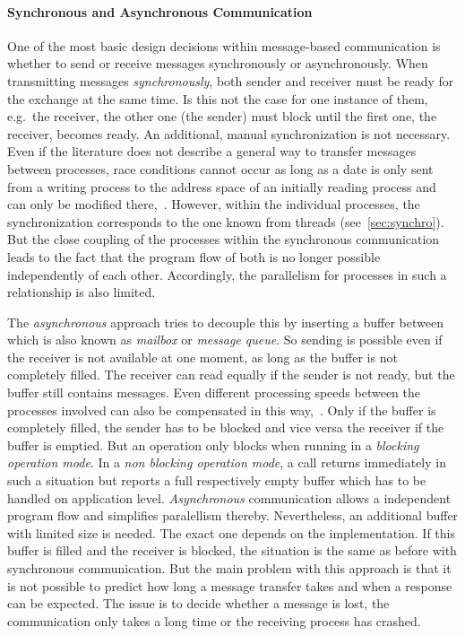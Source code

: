 \paragraph{Synchronous and Asynchronous Communication}
One of the most basic design decisions within message-based communication is whether to send or receive messages synchronously or asynchronously.
When transmitting messages \textit{synchronously}, both sender and receiver must be ready for the exchange at the same time\cite{glatz2015betriebssysteme}.
Is this not the case for one instance of them, e.g.\ the receiver, the other one (the sender) must block until the first one, the receiver, becomes ready.
An additional, manual synchronization is not necessary.
Even if the literature does not describe a general way to transfer messages between processes, race conditions cannot occur as long as a date is only sent from a writing process to the address space of an initially reading process and can only be modified there\cite{brause2017betriebssysteme},~\cite{glatz2015betriebssysteme}.
However, within the individual processes, the synchronization corresponds to the one known from threads (see~\ref{sec:synchro}).
But the close coupling of the processes within the synchronous communication leads to the fact that the program flow of both is no longer possible independently of each other.
Accordingly, the parallelism for processes in such a relationship is also limited\cite{brause2017betriebssysteme}.

The \textit{asynchronous} approach tries to decouple this by inserting a buffer between which is also known as \textit{mailbox} or \textit{message queue}.
So sending is possible even if the receiver is not available at one moment, as long as the buffer is not completely filled.
The receiver can read equally if the sender is not ready, but the buffer still contains messages.
Even different processing speeds between the processes involved can also be compensated in this way\cite{glatz2015betriebssysteme},~\cite{brause2017betriebssysteme}.
Only if the buffer is completely filled, the sender has to be blocked and vice versa the receiver if the buffer is emptied.
But an operation only blocks when running in a \textit{blocking operation mode}.
In a \textit{non blocking operation mode}, a call returns immediately in such a situation but reports a full respectively empty buffer which has to be handled on application level\cite{glatz2015betriebssysteme}.
\textit{Asynchronous} communication allows a independent program flow and simplifies paralellism thereby.
Nevertheless, an additional buffer with limited size is needed.
The exact one depends on the implementation.
If this buffer is filled and the receiver is blocked, the situation is the same as before with synchronous communication.
But the main problem with this approach is that it is not possible to predict how long a message transfer takes and when a response can be expected\cite{glatz2015betriebssysteme}.
The issue is to decide whether a message is lost, the communication only takes a long time or the receiving process has crashed\cite{tanenbaum-modern-operating-systems}.

